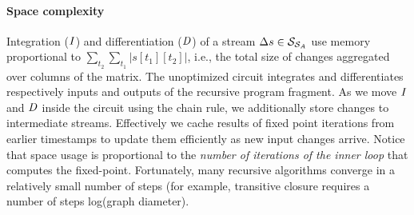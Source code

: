 \paragraph{Space complexity} Integration ($\mathit{I}$) and differentiation ($\mathit{D}$) of a
stream $\Delta s \in \mathcal{S}_{\mathcal{S}_{A}}$ use memory proportional to
$\sum_{t_2}\sum_{t_1}|s[t_1][t_2]|$, i.e., the total size of changes
aggregated over columns of the matrix.  The unoptimized circuit integrates
and differentiates respectively inputs and outputs of the recursive program
fragment.  As we move $\mathit{I}$ and $\mathit{D}$ inside the circuit using the chain rule, we
additionally store changes to intermediate streams.  Effectively we cache results of
fixed point iterations from earlier timestamps to update them efficiently as new input changes arrive.
Notice that space usage is proportional to the \emph{number of iterations of the inner loop}
that computes the fixed-point.
Fortunately, many recursive algorithms converge in a relatively small number of steps
(for example, transitive closure requires a number of steps  log(graph diameter).
